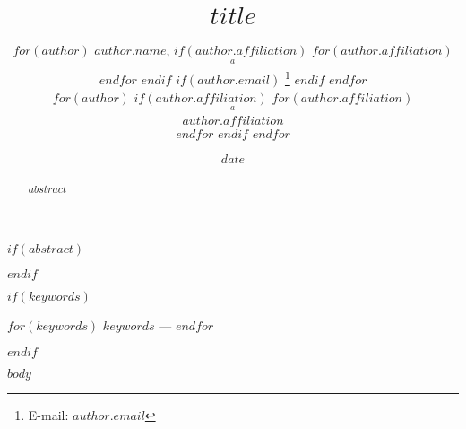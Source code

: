 \documentclass[a4paper,fleqn,usenatbib]{mnras}
\title[$shorttitle$]{$title$}
\author[$shortauthors$]{
$for(author)$
$author.name$,
$if(author.affiliation)$
$for(author.affiliation)$
$$^{a}$$
$endfor$
$endif$
$if(author.email)$
\thanks{E-mail: $author.email$}
$endif$
$endfor$
\\
$for(author)$
$if(author.affiliation)$
$for(author.affiliation)$
$$^{a}$$ $author.affiliation$\\
$endfor$
$endif$
$endfor$
}
\date{$date$}
\begin{document}
\label{firstpage}
\pagerange{\pageref{firstpage}--\pageref{lastpage}}
\maketitle

$if(abstract)$
\begin{abstract}
$abstract$
\end{abstract}
$endif$

$if(keywords)$
\begin{keywords}
$for(keywords)$
    $keywords$ --- 
$endfor$
\end{keywords}
$endif$

$body$
\end{document}
